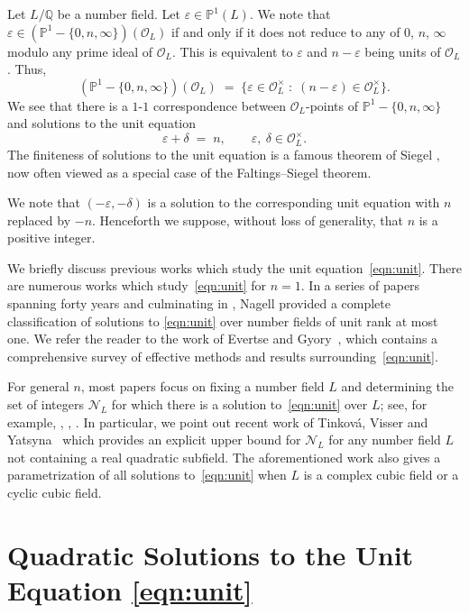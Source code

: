 \documentclass{amsart}
\newcommand{\PP}{\mathbb{P}}
\newcommand{\Q}{\mathbb{Q}}
\newcommand{\OO}{\mathcal{O}}
\renewcommand{\setminus}{-}
\theoremstyle{definition}
\theoremstyle{remark}
\begin{document}
Let $L/\Q$ be a number field. Let $\varepsilon \in \PP^1(L)$.
We note that $\varepsilon \in (\PP^1 \setminus \{0,n,\infty\})(\OO_L)$
if and only if it does not reduce to any of $0$, $n$, $\infty$
modulo any prime ideal of $\OO_L$. This is equivalent to
$\varepsilon$ and $n-\varepsilon$ being units of $\OO_L$.
Thus,
\[
	(\PP^1 \setminus \{0,n,\infty\})(\OO_L) \; = \; \{\varepsilon \in \OO_L^\times \; : \; (n-\varepsilon) \in \OO_L^\times\}.
\]
We see that there is a $1$-$1$ correspondence between $\OO_L$-points of $\PP^1 \setminus \{0,n,\infty\}$
and solutions to the unit equation
\begin{equation}\label{eqn:unit}
	\varepsilon+\delta \; = \; n, \qquad \varepsilon,~\delta \in \OO_L^\times.
\end{equation}
The finiteness of solutions to the unit equation is a famous theorem of Siegel \cite{Siegel},
now often viewed as a special case of the Faltings--Siegel theorem.


We note that $(-\varepsilon,-\delta)$ is a solution to the corresponding unit equation
with $n$ replaced by $-n$. Henceforth we suppose, without loss of generality, that $n$ is a positive integer.

\medskip

We briefly discuss previous works which study the unit equation~\eqref{eqn:unit}. 
There are numerous works which study~\eqref{eqn:unit} for $n=1$.
In a series of papers spanning 
forty years and culminating in \cite{Nagell2,Nagell}, Nagell provided a 
complete classification of solutions to \eqref{eqn:unit} over number fields of unit rank 
at most one. We refer the reader to the work of Evertse and Gyory~\cite{EvertseGyory}, 
which contains a comprehensive survey of effective methods and results surrounding~\eqref{eqn:unit}.

For general $n$, most papers focus on fixing a number field $L$ and determining 
the set of integers $\mathcal{N}_{L}$ for which there is a solution to~\eqref{eqn:unit} over $L$; 
see, for example, \cite{Jarden07}, \cite{Kostra}, \cite{Newman}. 
In particular, we point out recent work of Tinkov\'{a}, Visser and Yatsyna~\cite{TVY26} which 
provides an explicit upper bound for $\mathcal{N}_{L}$ for any number field $L$ 
not containing a real quadratic subfield. 
The aforementioned work also gives a parametrization of all solutions 
to~\eqref{eqn:unit} when $L$ is a complex cubic field or a cyclic cubic field.





\section{Quadratic Solutions to the Unit Equation \eqref{eqn:unit}}\label{sec:quadratic}
\end{document}
